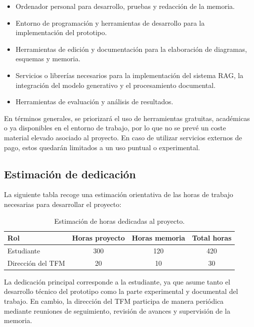 \begin{itemize}
    \item Ordenador personal para desarrollo, pruebas y redacción de la memoria.
    \item Entorno de programación y herramientas de desarrollo para la implementación del prototipo.
    \item Herramientas de edición y documentación para la elaboración de diagramas, esquemas y memoria.
    \item Servicios o librerías necesarios para la implementación del sistema RAG, la integración del modelo generativo y el procesamiento documental.
    \item Herramientas de evaluación y análisis de resultados.
\end{itemize}

En términos generales, se priorizará el uso de herramientas gratuitas, académicas o ya disponibles en el entorno de trabajo, por lo que no se prevé un coste material elevado asociado al proyecto. 
En caso de utilizar servicios externos de pago, estos quedarán limitados a un uso puntual o experimental.

\subsection{Estimación de dedicación}

La siguiente tabla recoge una estimación orientativa de las horas de trabajo necesarias para desarrollar el proyecto:

\begin{table}[H]
\centering
\begin{tabular}{lccc}
\toprule
\textbf{Rol} & \textbf{Horas proyecto} & \textbf{Horas memoria} & \textbf{Total horas} \\
\midrule
Estudiante & 300 & 120 & 420 \\
Dirección del TFM & 20 & 10 & 30 \\
\bottomrule
\end{tabular}
\caption{Estimación de horas dedicadas al proyecto.}
\label{tab:horas_proyecto}
\end{table}

La dedicación principal corresponde a la estudiante, ya que asume tanto el desarrollo técnico del prototipo como la parte experimental y documental del trabajo. 
En cambio, la dirección del TFM participa de manera periódica mediante reuniones de seguimiento, revisión de avances y supervisión de la memoria.

